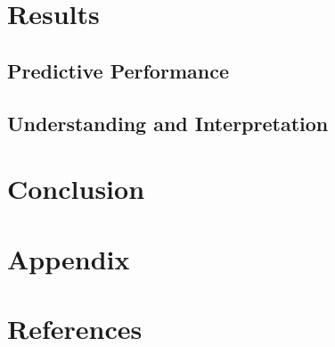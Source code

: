 \documentclass[12pt, letterpaper]{article}
\begin{document}
\section{Results} %


\subsection{Predictive Performance} %


\subsection{Understanding and Interpretation} %


\section{Conclusion} %


\section{Appendix}


\section{References}
\end{document}
